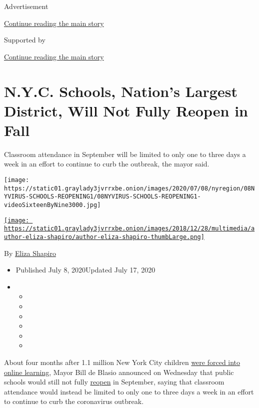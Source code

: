 Advertisement

\protect\hyperlink{after-top}{Continue reading the main story}

Supported by

\protect\hyperlink{after-sponsor}{Continue reading the main story}

\hypertarget{nyc-schools-nations-largest-district-will-not-fully-reopen-in-fall}{%
\section{N.Y.C. Schools, Nation's Largest District, Will Not Fully
Reopen in
Fall}\label{nyc-schools-nations-largest-district-will-not-fully-reopen-in-fall}}

Classroom attendance in September will be limited to only one to three
days a week in an effort to continue to curb the outbreak, the mayor
said.

\texttt{[image: https://static01.graylady3jvrrxbe.onion/images/2020/07/08/nyregion/08NYVIRUS-SCHOOLS-REOPENING1/08NYVIRUS-SCHOOLS-REOPENING1-videoSixteenByNine3000.jpg]}

\href{https://www.nytimes3xbfgragh.onion/by/eliza-shapiro}{\texttt{[image: https://static01.graylady3jvrrxbe.onion/images/2018/12/28/multimedia/author-eliza-shapiro/author-eliza-shapiro-thumbLarge.png]}}

By \href{https://www.nytimes3xbfgragh.onion/by/eliza-shapiro}{Eliza
Shapiro}

\begin{itemize}
\item
  Published July 8, 2020Updated July 17, 2020
\item
  \begin{itemize}
  \item
  \item
  \item
  \item
  \item
  \item
  \end{itemize}
\end{itemize}

About four months after 1.1 million New York City children
\href{https://www.nytimes3xbfgragh.onion/2020/03/15/nyregion/nyc-schools-closed.html}{were
forced into online learning}, Mayor Bill de Blasio announced on
Wednesday that public schools would still not fully
\href{https://www.nytimes3xbfgragh.onion/article/new-york-phase-reopening.html}{reopen}
in September, saying that classroom attendance would instead be limited
to only one to three days a week in an effort to continue to curb the
coronavirus outbreak.

